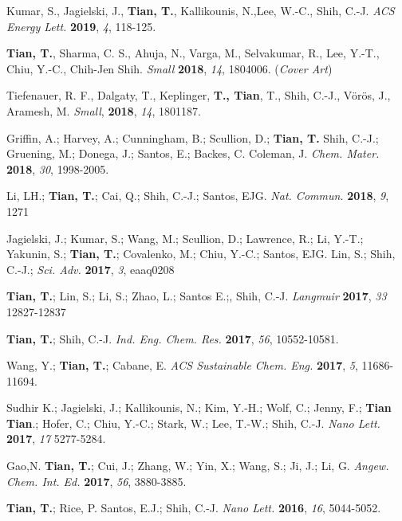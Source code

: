 
\begin{cventries}
  \cventry
  {}
  {}{}{}
  {
    \begin{cvenum}
    \item Kumar, S., Jagielski, J., \textbf{Tian, T.}, Kallikounis,
N.,Lee, W.-C., Shih, C.-J. \textit{ACS Energy Lett.}  \textbf{2019},
\textit{4}, 118-125.
    \item \textbf{Tian, T.}, Sharma, C. S., Ahuja, N., Varga, M.,
Selvakumar, R., Lee, Y.-T., Chiu, Y.-C., Chih-Jen Shih. \textit{Small}
\textbf{2018}, \textit{14}, 1804006. (\textit{Cover Art})
\item Tiefenauer, R. F., Dalgaty, T., Keplinger, \textbf{T., Tian},
T., Shih, C.-J., V\"{o}r\"{o}s, J., Aramesh, M. \textit{Small},
\textbf{2018}, \textit{14}, 1801187.
\item Griffin, A.; Harvey, A.; Cunningham, B.; Scullion, D.;
\textbf{Tian, T.} Shih, C.-J.; Gruening, M.; Donega, J.; Santos, E.;
Backes, C. Coleman, J. \textit{Chem. Mater.} \textbf{2018},
\textit{30}, 1998-2005.
\item Li, LH.; \textbf{Tian, T.}; Cai, Q.; Shih, C.-J.; Santos,
EJG. \textit{Nat. Commun.} \textbf{2018}, \textit{9}, 1271
\item Jagielski, J.; Kumar, S.; Wang, M.; Scullion, D.; Lawrence, R.;
Li, Y.-T.; Yakunin, S.; \textbf{Tian, T.}; Covalenko, M.; Chiu, Y.-C.;
Santos, EJG. Lin, S.; Shih, C.-J.; \textit{Sci. Adv.}  \textbf{2017},
\textit{3}, eaaq0208
  \item \textbf{Tian, T.}; Lin, S.; Li, S.; Zhao, L.; Santos E.;,
Shih, C.-J. \textit{Langmuir} \textbf{2017}, \textit{33} 12827-12837
  \item \textbf{Tian, T.}; Shih, C.-J. \textit{Ind. Eng. Chem. Res.}
\textbf{2017}, \textit{56}, 10552-10581.
  \item Wang, Y.; \textbf{Tian, T.}; Cabane, E. \textit{ACS
Sustainable Chem. Eng.} \textbf{2017}, \textit{5}, 11686-11694.
  \item Sudhir K.; Jagielski, J.; Kallikounis, N.; Kim, Y.-H.; Wolf,
C.; Jenny, F.; \textbf{Tian Tian}.; Hofer, C.; Chiu, Y.-C.; Stark, W.;
Lee, T.-W.; Shih, C.-J. \textit{Nano Lett.} \textbf{2017}, \textit{17}
5277-5284.
  \item Gao,N. \textbf{Tian, T.}; Cui, J.; Zhang, W.; Yin, X.; Wang,
S.; Ji, J.; Li, G. \textit{Angew. Chem. Int. Ed.} \textbf{2017},
\textit{56}, 3880-3885.
    \item \textbf{Tian, T.}; Rice, P. Santos, E.J.; Shih,
C.-J. \textit{Nano Lett.} \textbf{2016}, \textit{16}, 5044-5052.

\end{cvenum}}
\end{cventries}
